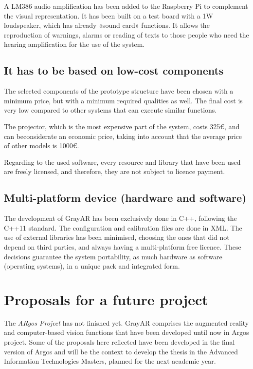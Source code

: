 A LM386 audio amplification has been added to the Raspberry Pi to complement the visual representation. It has been built on a test board with a 1W loudspeaker, which has already «sound card» functions. It allows the reproduction of
warnings, alarms or reading of texts to those people who need the hearing amplification for the use of the system.

\subsection{It has to be based on low-cost components}
The selected components of the prototype structure have been chosen with a minimum price, but with a minimum required qualities as well. The final cost is very low compared to other systems that can execute similar functions.

The projector, which is the most expensive part of the system, costs 325\euro, and can beconsiderate an economic price, taking into account that the average price of other models is 1000\euro.

Regarding to the used software, every resource and library that have been used are freely licensed, and therefore, they are not subject to licence payment.

\subsection{Multi-platform device (hardware and software)}
The development of GrayAR has been exclusively done in C++, following the C++11 standard. The configuration and calibration files are done in XML. The use of external libraries has been minimised, choosing the ones that did not depend on third parties, and always having a multi-platform free licence. These decisions guarantee the system portability, as much hardware as software (operating systems), in a unique pack and integrated form.


\section{Proposals for a future project}
The \textit{ARgos Project} has not finished yet. GrayAR comprises the augmented reality and computer-based vision functions that have been developed until now in Argos project. Some of the proposals here reflected have been developed in the final version of Argos and will be the context to develop the thesis in the Advanced Information Technologies Masters, planned for the next academic year. 

